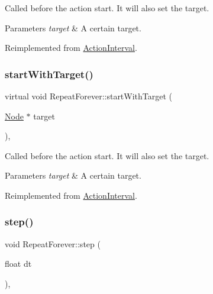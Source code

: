 Called before the action start. It will also set the target.


\begin{DoxyParams}{Parameters}
{\em target} & A certain target. \\
\hline
\end{DoxyParams}


Reimplemented from \hyperlink{classActionInterval_ad3d91186b2c3108488ddbbdbbd982484}{Action\+Interval}.

\mbox{\label{classRepeatForever_a83b514610d96b09673daa6aefcb2382a}} 
\subsubsection{\texorpdfstring{start\+With\+Target()}{startWithTarget()}\hspace{0.1cm}{\footnotesize\ttfamily [2/2]}}
{\footnotesize\ttfamily virtual void Repeat\+Forever\+::start\+With\+Target (\begin{DoxyParamCaption}\item[{\hyperlink{classNode}{Node} $\ast$}]{target }\end{DoxyParamCaption})\hspace{0.3cm}{\ttfamily [override]}, {\ttfamily [virtual]}}

Called before the action start. It will also set the target.


\begin{DoxyParams}{Parameters}
{\em target} & A certain target. \\
\hline
\end{DoxyParams}


Reimplemented from \hyperlink{classActionInterval_ad3d91186b2c3108488ddbbdbbd982484}{Action\+Interval}.

\mbox{\label{classRepeatForever_ab54150411685995a17a2b68d561e8d9c}} 
\subsubsection{\texorpdfstring{step()}{step()}\hspace{0.1cm}{\footnotesize\ttfamily [1/2]}}
{\footnotesize\ttfamily void Repeat\+Forever\+::step (\begin{DoxyParamCaption}\item[{float}]{dt }\end{DoxyParamCaption})\hspace{0.3cm}{\ttfamily [override]}, {\ttfamily [virtual]}}


